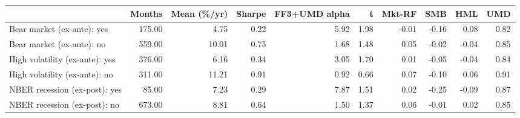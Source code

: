 \begin{tabular}{lrrrrrrrrr}
\toprule
 & Months & Mean (\%/yr) & Sharpe & FF3+UMD alpha & t & Mkt-RF & SMB & HML & UMD \\
\midrule
Bear market (ex-ante): yes & 175.00 & 4.75 & 0.22 & 5.92 & 1.98 & -0.01 & -0.16 & 0.08 & 0.82 \\
Bear market (ex-ante): no & 559.00 & 10.01 & 0.75 & 1.68 & 1.48 & 0.05 & -0.02 & -0.04 & 0.85 \\
High volatility (ex-ante): yes & 376.00 & 6.16 & 0.34 & 3.05 & 1.70 & 0.01 & -0.05 & -0.04 & 0.84 \\
High volatility (ex-ante): no & 311.00 & 11.21 & 0.91 & 0.92 & 0.66 & 0.07 & -0.10 & 0.06 & 0.91 \\
NBER recession (ex-post): yes & 85.00 & 7.23 & 0.29 & 7.87 & 1.51 & 0.02 & -0.25 & -0.09 & 0.87 \\
NBER recession (ex-post): no & 673.00 & 8.81 & 0.64 & 1.50 & 1.37 & 0.06 & -0.01 & 0.02 & 0.85 \\
\bottomrule
\end{tabular}
